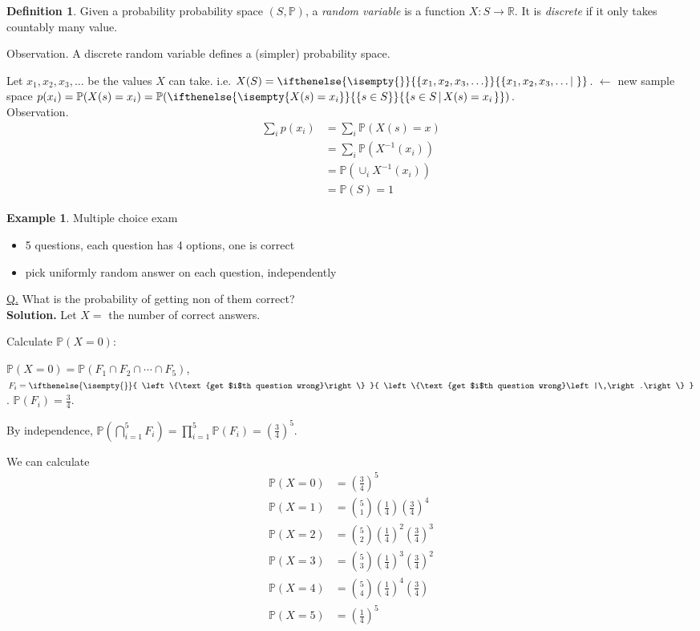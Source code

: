\documentclass[a4paper,11pt]{amsbook}
\theoremstyle{definition}
\newtheorem{definition}{\hspace{-2em} \color{darkblue} Definition}[chapter]
\newtheorem{example}{\hspace{-2em} \color{darkblue} Example}[chapter]
\theoremstyle{remark}
\newcommand{\R}{\mathbb{R}}
\renewcommand{\P}{\mathbb{P}}
\newcommand\0{\varnothing}
\newcommand\set[2][]
{
    \ifthenelse{\isempty{#1}}
    {
        \left\{#2\right\}
    }
    {
        \left\{#2\left|\,#1\right.\right\}
    }
}
\begin{document}
    \begin{definition}
        Given a probability probability space $(S,\P)$, a \emph{random variable} is a function $X:S\to\R$.
        It is \emph{discrete} if it only takes countably many value.
    \end{definition}
    \noindent Observation. A discrete random variable defines a (simpler) probability space.
    
    Let $x_1,x_2,x_3,\ldots$ be the values $X$ can take. i.e. $X(S)=\set{x_1,x_2,x_3,\ldots}$. $\leftarrow$ new sample space
    $p(x_i)=\P(X(s)=x_i)=\P(\set[X(s)=x_i]{s\in S})$.\\
    \noindent Observation. \begin{align*}
        \sum_ip(x_i)&=\sum_i\P(X(s)=x) \\
        &=\sum_i\P(X^{-1}(x_i)) \tag{pairwise disjoint} \\
        &=\P(\cup_iX^{-1}(x_i)) \\
        &=\P(S)=1
    \end{align*}
    
    \begin{example} \label{multiple choice}
        Multiple choice exam \begin{itemize}
            \item 5 questions, each question has 4 options, one is correct
            \item pick uniformly random answer on each question, independently
        \end{itemize}
        \underline{Q.} What is the probability of getting non of them correct?\\
        \textbf{Solution.} Let $X=$ the number of correct answers.

        Calculate $\P(X=0)$:

        $\P(X=0)=\P(F_1\cap F_2\cap\cdots\cap F_5)$, $F_i=\set{\text{get $i$th question wrong}}$. $\P(F_i)=\frac34$.
        
        By independence, $\P\left(\bigcap_{i=1}^5F_i\right)=\prod_{i=1}^5\P(F_i)=\left(\frac34\right)^5$.

        We can calculate \begin{align*}
            \P(X=0)&=\left(\frac34\right)^5 \\
            \P(X=1)&=\binom51\left(\frac14\right)\left(\frac34\right)^4 \\
            \P(X=2)&=\binom52\left(\frac14\right)^2\left(\frac34\right)^3 \\
            \P(X=3)&=\binom53\left(\frac14\right)^3\left(\frac34\right)^2 \\
            \P(X=4)&=\binom54\left(\frac14\right)^4\left(\frac34\right) \\
            \P(X=5)&=\left(\frac14\right)^5
        \end{align*}
    \end{example}
\end{document}
